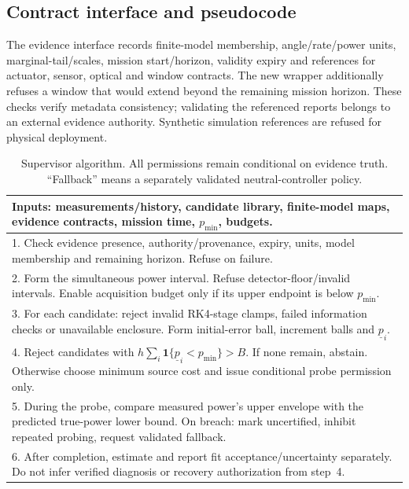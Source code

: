 \subsection{Contract interface and pseudocode}
The evidence interface records finite-model membership, angle/rate/power units, marginal-tail/scales, mission start/horizon, validity expiry and references for actuator, sensor, optical and window contracts. The new wrapper additionally refuses a window that would extend beyond the remaining mission horizon. These checks verify metadata consistency; validating the referenced reports belongs to an external evidence authority. Synthetic simulation references are refused for physical deployment.

\begin{table}[t]
\caption{Supervisor algorithm. All permissions remain conditional on evidence truth. ``Fallback'' means a separately validated neutral-controller policy.}
\centering\footnotesize
\begin{tabular}{@{}p{}@{}}\toprule
\textbf{Inputs:} measurements/history, candidate library, finite-model maps, evidence contracts, mission time, $p_{\min}$, budgets.\\\midrule
1. Check evidence presence, authority/provenance, expiry, units, model membership and remaining horizon. Refuse on failure.\\
2. Form the simultaneous power interval. Refuse detector-floor/invalid intervals. Enable acquisition budget only if its upper endpoint is below $p_{\min}$.\\
3. For each candidate: reject invalid RK4-stage clamps, failed information checks or unavailable enclosure. Form initial-error ball, increment balls and $\underline p_i$.\\
4. Reject candidates with $h\sum_i\mathbf1\{\underline p_i<p_{\min}\}>B$. If none remain, abstain. Otherwise choose minimum source cost and issue conditional probe permission only.\\
5. During the probe, compare measured power's upper envelope with the predicted true-power lower bound. On breach: mark uncertified, inhibit repeated probing, request validated fallback.\\
6. After completion, estimate and report fit acceptance/uncertainty separately. Do not infer verified diagnosis or recovery authorization from step~4.\\\bottomrule
\end{tabular}
\label{tab:algorithm}
\end{table}

